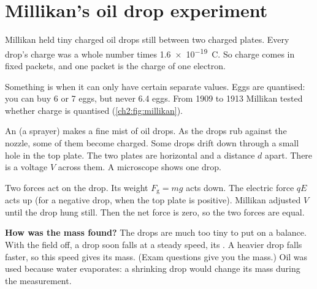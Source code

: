 \section{Millikan's oil drop experiment}\label{ch2:sec:millikan}

\begin{bigidea}
Millikan held tiny charged oil drops still between two charged plates. Every
drop's charge was a whole number times \qty{1.6e-19}{C}. So charge comes in fixed
packets, and one packet is the charge of one electron.
\end{bigidea}

\begin{keywords}
\end{keywords}

Something is  when it can only have certain separate values.
Eggs are quantised: you can buy 6 or 7 eggs, but never 6.4 eggs. From 1909 to
1913 Millikan tested whether charge is quantised (\cref{ch2:fig:millikan}).

An  (a sprayer) makes a fine mist of oil drops. As the drops rub
against the nozzle, some of them become charged. Some drops drift down through
a small hole in the top plate. The two plates are horizontal and a distance $d$
apart. There is a voltage $V$ across them. A microscope shows one drop.

Two forces act on the drop. Its weight $F_\mathrm{g} = mg$ acts down. The
electric force $qE$ acts up (for a negative drop, when the top plate is positive).
Millikan adjusted $V$ until the drop hung still. Then the net force is zero, so
the two forces are equal.

\textbf{How was the mass found?} The drops are much too tiny to put on a balance.
With the field off, a drop soon falls at a steady speed, its .
A heavier drop falls faster, so this speed gives its mass. (Exam questions give
you the mass.) Oil was used because water evaporates: a shrinking drop would
change its mass during the measurement.

